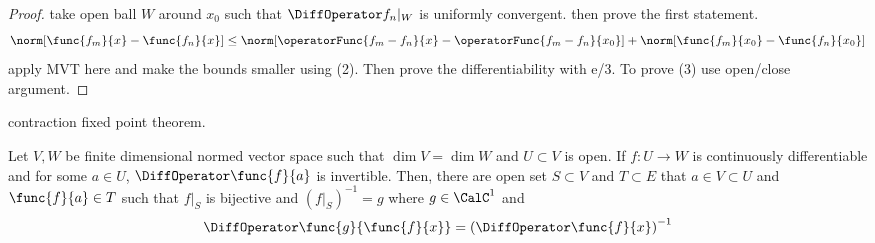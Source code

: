 \begin{proof}
    take open ball \(W\) around \(x_0\) such that \(\DiffOperator f_n|_W\) is uniformly convergent. then prove the first statement.
    \begin{equation*}
        \norm[\func{f_m}{x} - \func{f_n}{x}] \leq \norm[\operatorFunc{f_m - f_n}{x} - \operatorFunc{f_m - f_n}{x_0}] + \norm[\func{f_m}{x_0} - \func{f_n}{x_0}]
    \end{equation*}
    apply MVT here and make the bounds smaller using (2). Then prove the differentiability with e/3. To prove (3) use open/close argument.
\end{proof}

contraction fixed point theorem.

\begin{theorem}
    Let \(V,W\) be finite dimensional normed vector space such that \(\dim V = \dim W\) and \(U \subset V\) is open. If \(f : U \to W\) is continuously differentiable and for some \(a \in U\), \(\DiffOperator \func{f}{a}\) is invertible. Then, there are open set \(S \subset V\) and \(T \subset E\) that \(a \in V \subset U\) and \(\func{f}{a} \in T\) such that \(f|_S\) is bijective and \((f|_S)^{-1} = g\) where \(g \in \CalC^1\) and
    \begin{equation*}
        \DiffOperator \func{g}{\func{f}{x}} = \left(\DiffOperator \func{f}{x}\right)^{-1}
    \end{equation*}
\end{theorem}

